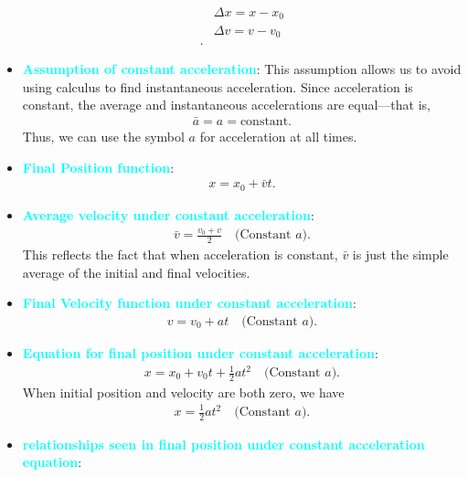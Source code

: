 \documentclass{report}
\begin{document}
\begin{itemize}
\begin{align*}
                &\Delta x = x - x_{0}\\
                &\Delta v = v- v_{0}\\
            .\end{align*}
        \item \textbf{\textcolor{cyan}{Assumption of constant acceleration}}: This assumption allows us to avoid using calculus to find instantaneous acceleration. Since acceleration is constant, the average and instantaneous accelerations are equal—that is,
            \begin{align*}
                \bar{a} = a = \text{constant}
            .\end{align*}
            Thus, we can use the symbol $a$ for acceleration at all times.
        \item \textbf{\textcolor{cyan}{Final Position function}}: 
            \begin{align*}
                x = x_{0}  + \bar{v}t
            .\end{align*}
        \item \textbf{\textcolor{cyan}{Average velocity under constant acceleration}}:
            \begin{align*}
                \bar{v} = \frac{v_{0} + v}{2} \quad \text{(Constant $a$)}
            .\end{align*}
            This reflects the fact that when acceleration is constant, $\bar{v}$ is just the simple average of the initial and final velocities.
        \item \textbf{\textcolor{cyan}{Final Velocity function under constant acceleration}}:
            \begin{align*}
                v = v_{0} + at \quad \text{(Constant $a$)}
            .\end{align*}
        \item \textbf{\textcolor{cyan}{Equation for final position under constant acceleration}}:
            \begin{align*}
                x = x_{0} +v_{0}t + \frac{1}{2}at^{2} \quad \text{(Constant $a$)}
            .\end{align*}
            When initial position and velocity are both zero, we have
            \begin{align*}
                x =  \frac{1}{2}at^{2} \quad \text{(Constant $a$)}
            .\end{align*}
        \item \textbf{\textcolor{cyan}{relationships seen in final position under constant acceleration equation}}:

\end{itemize}
\end{document}
